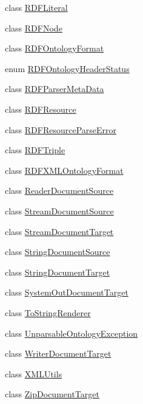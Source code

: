 \begin{DoxyCompactItemize}
class \hyperlink{classorg_1_1semanticweb_1_1owlapi_1_1io_1_1_r_d_f_literal}{R\-D\-F\-Literal}
\item 
class \hyperlink{classorg_1_1semanticweb_1_1owlapi_1_1io_1_1_r_d_f_node}{R\-D\-F\-Node}
\item 
class \hyperlink{classorg_1_1semanticweb_1_1owlapi_1_1io_1_1_r_d_f_ontology_format}{R\-D\-F\-Ontology\-Format}
\item 
enum \hyperlink{enumorg_1_1semanticweb_1_1owlapi_1_1io_1_1_r_d_f_ontology_header_status}{R\-D\-F\-Ontology\-Header\-Status}
\item 
class \hyperlink{classorg_1_1semanticweb_1_1owlapi_1_1io_1_1_r_d_f_parser_meta_data}{R\-D\-F\-Parser\-Meta\-Data}
\item 
class \hyperlink{classorg_1_1semanticweb_1_1owlapi_1_1io_1_1_r_d_f_resource}{R\-D\-F\-Resource}
\item 
class \hyperlink{classorg_1_1semanticweb_1_1owlapi_1_1io_1_1_r_d_f_resource_parse_error}{R\-D\-F\-Resource\-Parse\-Error}
\item 
class \hyperlink{classorg_1_1semanticweb_1_1owlapi_1_1io_1_1_r_d_f_triple}{R\-D\-F\-Triple}
\item 
class \hyperlink{classorg_1_1semanticweb_1_1owlapi_1_1io_1_1_r_d_f_x_m_l_ontology_format}{R\-D\-F\-X\-M\-L\-Ontology\-Format}
\item 
class \hyperlink{classorg_1_1semanticweb_1_1owlapi_1_1io_1_1_reader_document_source}{Reader\-Document\-Source}
\item 
class \hyperlink{classorg_1_1semanticweb_1_1owlapi_1_1io_1_1_stream_document_source}{Stream\-Document\-Source}
\item 
class \hyperlink{classorg_1_1semanticweb_1_1owlapi_1_1io_1_1_stream_document_target}{Stream\-Document\-Target}
\item 
class \hyperlink{classorg_1_1semanticweb_1_1owlapi_1_1io_1_1_string_document_source}{String\-Document\-Source}
\item 
class \hyperlink{classorg_1_1semanticweb_1_1owlapi_1_1io_1_1_string_document_target}{String\-Document\-Target}
\item 
class \hyperlink{classorg_1_1semanticweb_1_1owlapi_1_1io_1_1_system_out_document_target}{System\-Out\-Document\-Target}
\item 
class \hyperlink{classorg_1_1semanticweb_1_1owlapi_1_1io_1_1_to_string_renderer}{To\-String\-Renderer}
\item 
class \hyperlink{classorg_1_1semanticweb_1_1owlapi_1_1io_1_1_unparsable_ontology_exception}{Unparsable\-Ontology\-Exception}
\item 
class \hyperlink{classorg_1_1semanticweb_1_1owlapi_1_1io_1_1_writer_document_target}{Writer\-Document\-Target}
\item 
class \hyperlink{classorg_1_1semanticweb_1_1owlapi_1_1io_1_1_x_m_l_utils}{X\-M\-L\-Utils}
\item 
class \hyperlink{classorg_1_1semanticweb_1_1owlapi_1_1io_1_1_zip_document_target}{Zip\-Document\-Target}
\end{DoxyCompactItemize}
